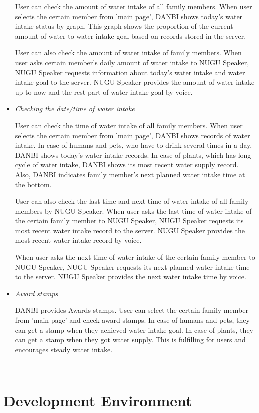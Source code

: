 \documentclass[conference]{IEEEtran}
\begin{document}
\begin{itemize}
User can check the amount of water intake of all family members. When user selects the certain member from 'main page', DANBI shows today's water intake status by graph. This graph shows the proportion of the current amount of water to water intake goal based on records stored in the server.

User can also check the amount of water intake of family members. When user asks certain member's daily amount of water intake to NUGU Speaker, NUGU Speaker requests information about today's water intake and water intake goal to the server. NUGU Speaker provides the amount of water intake up to now and the rest part of water intake goal by voice.
\item \textit{Checking the date/time of water intake} 

User can check the time of water intake of all family members. When user selects the certain member from 'main page', DANBI shows records of water intake. In case of humans and pets, who have to drink several times in a day, DANBI shows today's water intake records. In case of plants, which has long cycle of water intake, DANBI shows its most recent water supply record. Also, DANBI indicates family member's next planned water intake time at the bottom.

User can also check the last time and next time of water intake of all family members by NUGU Speaker. When user asks the last time of water intake of the certain family member to NUGU Speaker, NUGU Speaker requests its most recent water intake record to the server. NUGU Speaker provides the most recent water intake record by voice.

When user asks the next time of water intake of the certain family member to NUGU Speaker, NUGU Speaker requests its next planned water intake time to the server. NUGU Speaker provides the next water intake time by voice.
\item \textit{Award stamps}

DANBI provides Awards stamps. User can select the certain family member from 'main page' and check award stamps. In case of humans and pets, they can get a stamp when they achieved water intake goal. In case of plants, they can get a stamp when they got water supply. This is fulfilling for users and encourages steady water intake.
\end{itemize}

\ 

\section{Development Environment}
\end{document}
